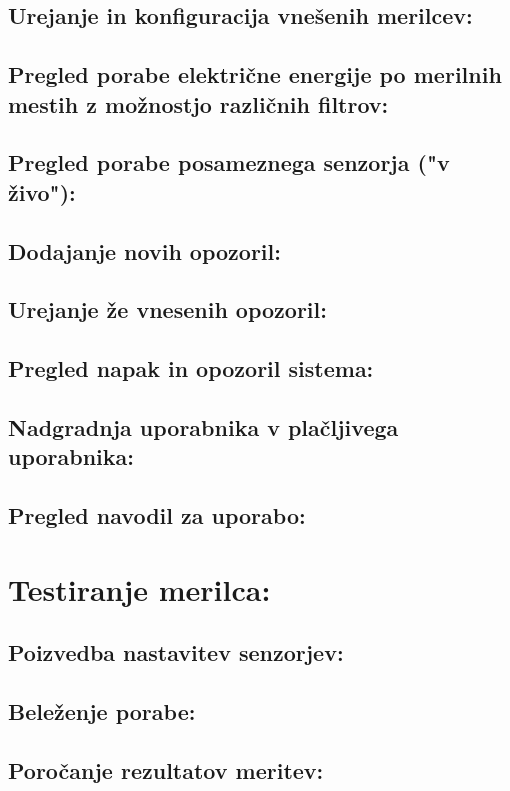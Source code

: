 \documentclass[12pt,a4paper,titlepage,openany]{report}
\begin{document}
\subsection{Urejanje in konfiguracija vnešenih merilcev:}
\subsection{Pregled porabe električne energije po merilnih mestih z možnostjo različnih filtrov:}
\subsection{Pregled porabe posameznega senzorja ("v živo"):}
\subsection{Dodajanje novih opozoril:}
\subsection{Urejanje že vnesenih opozoril:}
\subsection{Pregled napak in opozoril sistema:}
\subsection{Nadgradnja uporabnika v plačljivega uporabnika:}
\subsection{Pregled navodil za uporabo:}

\section{Testiranje merilca:}
\thispagestyle{fancy}


\subsection{Poizvedba nastavitev senzorjev:}
\subsection{Beleženje porabe:}
\subsection{Poročanje rezultatov meritev:}
\end{document}
